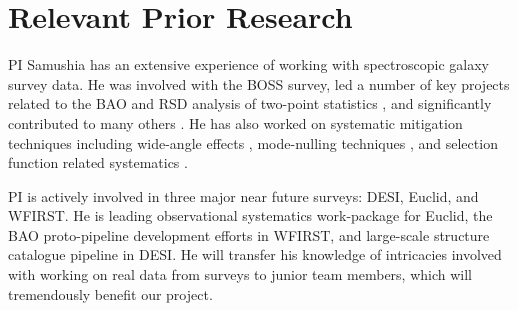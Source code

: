 





\section{Relevant Prior Research}

PI Samushia has an extensive experience of working with spectroscopic galaxy
survey data. He was involved with the BOSS survey, led a number of key projects
related to the BAO and RSD analysis of two-point statistics
\cite{2013MNRAS.429.1514S,2014MNRAS.439.3504S}, and significantly contributed
to many others
\cite{2012MNRAS.426.2719R,2015MNRAS.447..437M,2015MNRAS.449..835R,2015MNRAS.449..848H}.
He has also worked on systematic mitigation techniques including wide-angle
effects \cite{2010MNRAS.409.1525R,2012MNRAS.420.2102S,2015MNRAS.452.3704S},
mode-nulling techniques \cite{2016MNRAS.463..467K,2019MNRAS.482..453K}, and
selection function related systematics \cite{2014MNRAS.437.1109R}.

PI is actively involved in three major near future surveys: DESI, Euclid, and
WFIRST. He is leading observational systematics work-package for Euclid, the
BAO proto-pipeline development efforts in WFIRST, and large-scale structure
catalogue pipeline in DESI. He will transfer his knowledge of intricacies
involved with working on real data from surveys to junior team members, which
will tremendously benefit our project.

